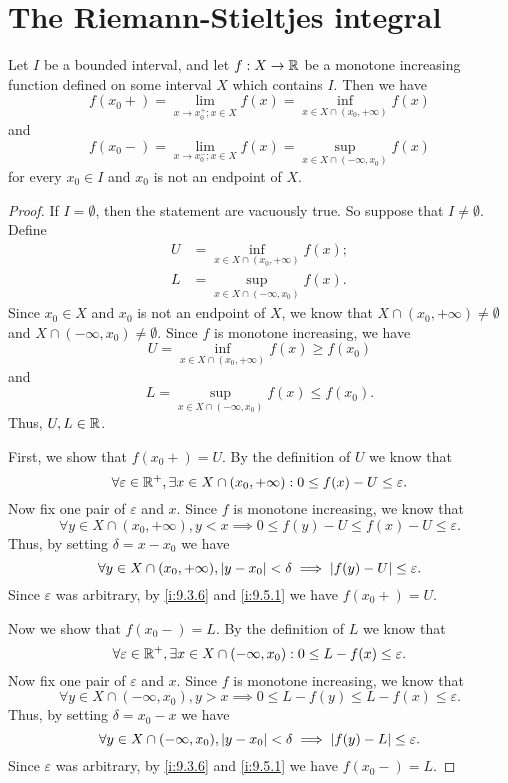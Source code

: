 \section{The Riemann-Stieltjes integral}\label{i:sec:11.8}

\begin{ac}\label{i:ac:11.8.1}
  Let \(I\) be a bounded interval, and let \(f : X \to \mathbb{R}\) be a monotone increasing function defined on some interval \(X\) which contains \(I\).
  Then we have
  \[
    f(x_0+) = \lim_{x \to x_0^+ ; x \in X} f(x) = \inf_{x \in X \cap (x_0, +\infty)} f(x)
  \]
  and
  \[
    f(x_0-) = \lim_{x \to x_0^- ; x \in X} f(x) = \sup_{x \in X \cap (-\infty, x_0)} f(x)
  \]
  for every \(x_0 \in I\) and \(x_0\) is not an endpoint of \(X\).
\end{ac}

\begin{proof}
  If \(I = \emptyset\), then the statement are vacuously true.
  So suppose that \(I \neq \emptyset\).
  Define
  \begin{align*}
    U & = \inf_{x \in X \cap (x_0, +\infty)} f(x); \\
    L & = \sup_{x \in X \cap (-\infty, x_0)} f(x).
  \end{align*}
  Since \(x_0 \in X\) and \(x_0\) is not an endpoint of \(X\), we know that \(X \cap (x_0, +\infty) \neq \emptyset\) and \(X \cap (-\infty, x_0) \neq \emptyset\).
  Since \(f\) is monotone increasing, we have
  \[
    U = \inf_{x \in X \cap (x_0, +\infty)} f(x) \geq f(x_0)
  \]
  and
  \[
    L = \sup_{x \in X \cap (-\infty, x_0)} f(x) \leq f(x_0).
  \]
  Thus, \(U, L \in \mathbb{R}\).

  First, we show that \(f(x_0+) = U\).
  By the definition of \(U\) we know that
  \[
    \forall \varepsilon \in \mathbb{R}^+, \exists x \in X \cap (x_0, +\infty) : 0 \leq f(x) - U \leq \varepsilon.
  \]
  Now fix one pair of \(\varepsilon\) and \(x\).
  Since \(f\) is monotone increasing, we know that
  \[
    \forall y \in X \cap (x_0, +\infty), y < x \implies 0 \leq f(y) - U \leq f(x) - U \leq \varepsilon.
  \]
  Thus, by setting \(\delta = x - x_0\) we have
  \[
    \forall y \in X \cap (x_0, +\infty), \left\lvert y - x_0\right\rvert < \delta \implies \left\lvert f(y) - U\right\rvert \leq \varepsilon.
  \]
  Since \(\varepsilon\) was arbitrary, by \cref{i:9.3.6} and \cref{i:9.5.1} we have \(f(x_0+) = U\).

  Now we show that \(f(x_0-) = L\).
  By the definition of \(L\) we know that
  \[
    \forall \varepsilon \in \mathbb{R}^+, \exists x \in X \cap (-\infty, x_0) : 0 \leq L - f(x) \leq \varepsilon.
  \]
  Now fix one pair of \(\varepsilon\) and \(x\).
  Since \(f\) is monotone increasing, we know that
  \[
    \forall y \in X \cap (-\infty, x_0), y > x \implies 0 \leq L - f(y) \leq L - f(x) \leq \varepsilon.
  \]
  Thus, by setting \(\delta = x_0 - x\) we have
  \[
    \forall y \in X \cap (-\infty, x_0), \left\lvert y - x_0\right\rvert < \delta \implies \left\lvert f(y) - L\right\rvert \leq \varepsilon.
  \]
  Since \(\varepsilon\) was arbitrary, by \cref{i:9.3.6} and \cref{i:9.5.1} we have \(f(x_0-) = L\).
\end{proof}

